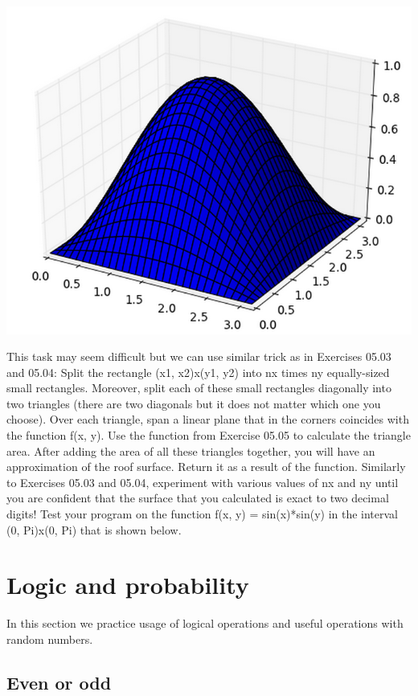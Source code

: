 \begin{center}
\includegraphics[height=0.5\textwidth]{img/area-1.png}
\end{center}
\noindent
This task 
may seem difficult but we can use similar trick as in Exercises 05.03 and 05.04: Split the rectangle 
(x1, x2)x(y1, y2) into nx times ny equally-sized small rectangles. Moreover, split each of these small rectangles 
diagonally into two triangles (there are two diagonals but it does not matter which one you choose). Over each 
triangle, span a linear plane that in the corners coincides with the function f(x, y). Use the function from Exercise 
05.05 to calculate the triangle area. After adding the area of 
all these triangles together, you will have an approximation of the roof surface. Return it as a result of the function. 
Similarly to Exercises 05.03 and 05.04, experiment with various values of nx and 
ny until you are confident that the surface that you 
calculated is exact to two decimal digits! Test your program on the function f(x, y) = sin(x)*sin(y) in the interval
(0, Pi)x(0, Pi) that is shown below.


\section{Logic and probability}

In this section we practice usage of logical operations and useful operations 
with random numbers.


\subsection{Even or odd}

